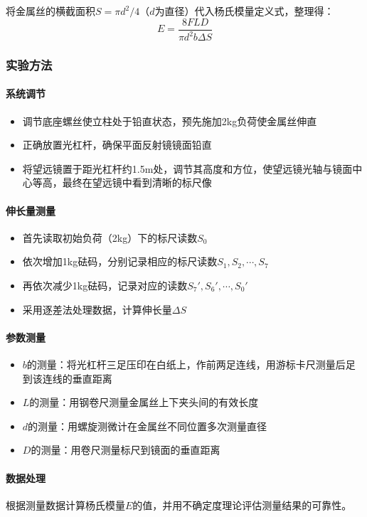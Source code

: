 \documentclass[]{../template/Report}%
\begin{document}
将金属丝的横截面积$S = \pi d^2/4$（$d$为直径）代入杨氏模量定义式，整理得：
\begin{equation}
E = \frac{8FLD}{\pi d^2 b \Delta S}
\end{equation}

\subsubsection{实验方法}
\paragraph{系统调节}
\begin{itemize}
\item 调节底座螺丝使立柱处于铅直状态，预先施加2kg负荷使金属丝伸直
\item 正确放置光杠杆，确保平面反射镜镜面铅直
\item 将望远镜置于距光杠杆约1.5m处，调节其高度和方位，使望远镜光轴与镜面中心等高，最终在望远镜中看到清晰的标尺像
\end{itemize}

\paragraph{伸长量测量}
\begin{itemize}
\item 首先读取初始负荷（2kg）下的标尺读数$S_0$
\item 依次增加1kg砝码，分别记录相应的标尺读数$S_1, S_2, \cdots, S_7$
\item 再依次减少1kg砝码，记录对应的读数$S_7', S_6', \cdots, S_0'$
\item 采用逐差法处理数据，计算伸长量$\Delta S$
\end{itemize}

\paragraph{参数测量}
\begin{itemize}
\item $b$的测量：将光杠杆三足压印在白纸上，作前两足连线，用游标卡尺测量后足到该连线的垂直距离
\item $L$的测量：用钢卷尺测量金属丝上下夹头间的有效长度
\item $d$的测量：用螺旋测微计在金属丝不同位置多次测量直径
\item $D$的测量：用卷尺测量标尺到镜面的垂直距离
\end{itemize}

\paragraph{数据处理}
根据测量数据计算杨氏模量$E$的值，并用不确定度理论评估测量结果的可靠性。
\end{document}
